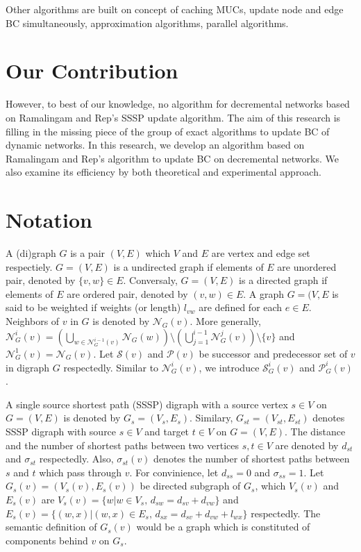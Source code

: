 \documentclass{article}
\begin{document}
\begin{multicols*}{2}
  Other algorithms are built on concept of caching MUCs\cite{Singh2015}, update node and edge BC simultaneously\cite{Kourtellis2015}, approximation algorithms\cite{Hayashi2015,Bergamini2015a,Bergamini2015b,Chernoskutov2015}, parallel algorithms\cite{Jamour2017}.

  \section{Our Contribution}
  However, to best of our knowledge, no algorithm for decremental networks based on Ramalingam and Rep's SSSP update algorithm.
  The aim of this research is filling in the missing piece of the group of exact algorithms to update BC of dynamic networks.
  In this research, we develop an algorithm based on Ramalingam and Rep's algorithm to update BC on decremental networks.
  We also examine its efficiency by both theoretical and experimental approach.

  \section{Notation}
  A (di)graph $G$ is a pair $(V,E)$ which $V$ and $E$ are vertex and edge set respectiely.
  $G=(V,E)$ is a undirected graph if elements of $E$ are unordered pair, denoted by $\{v,w\}\in E$.
  Conversaly, $G=(V,E)$ is a directed graph if elements of $E$ are ordered pair, denoted by $(v,w)\in E$.
  A graph $G=(V,E$ is said to be weighted if weights (or length) $l_{vw}$ are defined for each $e\in E$.
  Neighbors of $v$ in $G$ is denoted by $\mathcal{N}_G(v)$. More generally, $\mathcal{N}_G^i(v)=\left(\bigcup_{w\in\mathcal{N}_G^{i-1}(v)}\mathcal{N}_G(w)\right)\setminus\left(\bigcup_{j=1}^{i-1}\mathcal{N}_G^j(v)\right)\setminus\{v\}$ and $\mathcal{N}_G^1(v)=\mathcal{N}_G(v)$.
  Let $\mathcal{S}(v)$ and $\mathcal{P}(v)$ be successor and predecessor set of $v$ in digraph $G$ respectedly.
  Similar to $\mathcal{N}_G^i(v)$, we introduce $\mathcal{S}_G^i(v)$ and $\mathcal{P}_G^i(v)$.

  A single source shortest path (SSSP) digraph with a source vertex $s\in V$ on $G=(V,E)$ is denoted by $G_s=(V_s,E_s)$.
  Similary, $G_{st}=(V_{st},E_{st})$ denotes SSSP digraph with source $s\in V$ and target $t\in V$ on $G=(V,E)$.
  The distance and the number of shortest paths between two vertices $s,t\in V$ are denoted by $d_{st}$ and $\sigma_{st}$ respectedly.
  Also, $\sigma_{st}(v)$ denotes the number of shortest paths between $s$ and $t$ which pass through $v$.
  For convinience, let $d_{ss}=0$ and $\sigma_{ss}=1$.
  Let $G_{s}(v)=\left(V_s(v),E_s(v)\right)$ be directed subgraph of $G_s$, which  $V_s(v)$ and $E_s(v)$ are $V_s(v)=\{w|w\in V_s,\,d_{sw}=d_{sv}+d_{vw}\}$ and $E_s(v)=\{(w,x)|(w,x)\in E_s,\,d_{sx}=d_{sv}+d_{vw}+l_{wx}\}$ respectedly.
  The semantic definition of $G_s(v)$ would be a graph which is constituted of components behind $v$ on $G_s$.


\end{multicols*}
\end{document}
